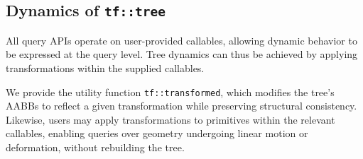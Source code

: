 \subsection{Dynamics of \texttt{tf::tree}}

All query APIs operate on user-provided callables,
allowing dynamic behavior to be expressed at the query level.
Tree dynamics can thus be achieved by applying
transformations within the supplied callables.

We provide the utility function \texttt{tf::transformed},
which modifies the tree’s AABBs to reflect a given
transformation while preserving structural consistency.
Likewise, users may apply transformations to primitives
within the relevant callables, enabling queries over
geometry undergoing linear motion or deformation,
without rebuilding the tree.

